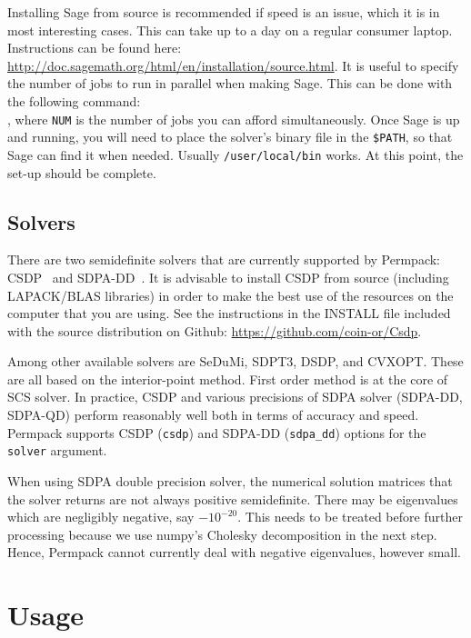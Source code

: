 Installing Sage from source is recommended if speed is an issue, which it is in most interesting cases. This can take up to a day on a regular consumer laptop. Instructions can be found here: \url{http://doc.sagemath.org/html/en/installation/source.html}. It is useful to specify the number of jobs to run in parallel when making Sage. This can be done with the following command:\\ , where \texttt{NUM} is the number of jobs you can afford simultaneously. Once Sage is up and running, you will need to place the solver's binary file in the \texttt{\$PATH}, so that Sage can find it when needed. Usually \texttt{/user/local/bin} works. At this point, the set-up should be complete.


\subsection{Solvers}
\label{sec:permpack-solvers}

There are two semidefinite solvers that are currently supported by Permpack: CSDP~\cite{csdp} and SDPA-DD~\cite{sdpa}. It is advisable to install CSDP from source (including LAPACK/BLAS libraries) in order to make the best use of the resources on the computer that you are using. See the instructions in the INSTALL file included with the source distribution on Github: \url{https://github.com/coin-or/Csdp}.

Among other available solvers are SeDuMi, SDPT3, DSDP, and CVXOPT. These are all based on the interior-point method. First order method is at the core of SCS solver. In practice, CSDP and various precisions of SDPA solver (SDPA-DD, SDPA-QD) perform reasonably well both in terms of accuracy and speed. Permpack supports CSDP (\texttt{csdp}) and SDPA-DD (\texttt{sdpa\_dd}) options for the \texttt{solver} argument.

\begin{note}
When using SDPA double precision solver, the numerical solution matrices that the solver returns are not always positive semidefinite. There may be eigenvalues which are negligibly negative, say $-10^{-20}$. This needs to be treated before further processing because we use numpy's Cholesky decomposition in the next step. Hence, Permpack cannot currently deal with negative eigenvalues, however small.
\end{note}

\section{Usage}
\label{sec:permpack-usage}

